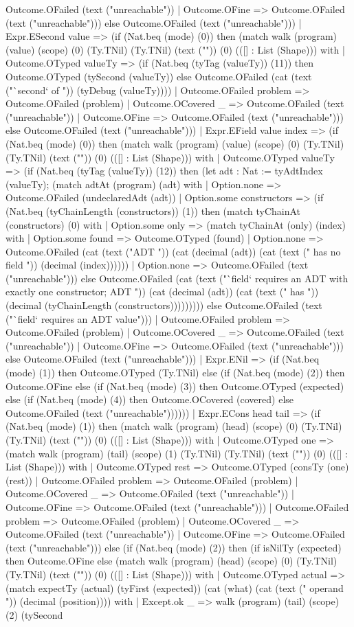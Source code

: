 \documentclass[11pt]{article}
\begin{document}
Outcome.OFailed (text ("unreachable")) | Outcome.OFine => Outcome.OFailed (text ("unreachable"))) else Outcome.OFailed (text ("unreachable"))) | Expr.ESecond value => (if (Nat.beq (mode) (0)) then (match walk (program) (value) (scope) (0) (Ty.TNil) (Ty.TNil) (text ("")) (0) (([] : List (Shape))) with | Outcome.OTyped valueTy => (if (Nat.beq (tyTag (valueTy)) (11)) then Outcome.OTyped (tySecond (valueTy)) else Outcome.OFailed (cat (text ("`second` of ")) (tyDebug (valueTy)))) | Outcome.OFailed problem => Outcome.OFailed (problem) | Outcome.OCovered \_ => Outcome.OFailed (text ("unreachable")) | Outcome.OFine => Outcome.OFailed (text ("unreachable"))) else Outcome.OFailed (text ("unreachable"))) | Expr.EField value index => (if (Nat.beq (mode) (0)) then (match walk (program) (value) (scope) (0) (Ty.TNil) (Ty.TNil) (text ("")) (0) (([] : List (Shape))) with | Outcome.OTyped valueTy => (if (Nat.beq (tyTag (valueTy)) (12)) then (let adt : Nat := tyAdtIndex (valueTy); (match adtAt (program) (adt) with | Option.none => Outcome.OFailed (undeclaredAdt (adt)) | Option.some constructors => (if (Nat.beq (tyChainLength (constructors)) (1)) then (match tyChainAt (constructors) (0) with | Option.some only => (match tyChainAt (only) (index) with | Option.some found => Outcome.OTyped (found) | Option.none => Outcome.OFailed (cat (text ("ADT ")) (cat (decimal (adt)) (cat (text (" has no field ")) (decimal (index)))))) | Option.none => Outcome.OFailed (text ("unreachable"))) else Outcome.OFailed (cat (text ("`field` requires an ADT with exactly one constructor; ADT ")) (cat (decimal (adt)) (cat (text (" has ")) (decimal (tyChainLength (constructors))))))))) else Outcome.OFailed (text ("`field` requires an ADT value"))) | Outcome.OFailed problem => Outcome.OFailed (problem) | Outcome.OCovered \_ => Outcome.OFailed (text ("unreachable")) | Outcome.OFine => Outcome.OFailed (text ("unreachable"))) else Outcome.OFailed (text ("unreachable"))) | Expr.ENil => (if (Nat.beq (mode) (1)) then Outcome.OTyped (Ty.TNil) else (if (Nat.beq (mode) (2)) then Outcome.OFine else (if (Nat.beq (mode) (3)) then Outcome.OTyped (expected) else (if (Nat.beq (mode) (4)) then Outcome.OCovered (covered) else Outcome.OFailed (text ("unreachable")))))) | Expr.ECons head tail => (if (Nat.beq (mode) (1)) then (match walk (program) (head) (scope) (0) (Ty.TNil) (Ty.TNil) (text ("")) (0) (([] : List (Shape))) with | Outcome.OTyped one => (match walk (program) (tail) (scope) (1) (Ty.TNil) (Ty.TNil) (text ("")) (0) (([] : List (Shape))) with | Outcome.OTyped rest => Outcome.OTyped (consTy (one) (rest)) | Outcome.OFailed problem => Outcome.OFailed (problem) | Outcome.OCovered \_ => Outcome.OFailed (text ("unreachable")) | Outcome.OFine => Outcome.OFailed (text ("unreachable"))) | Outcome.OFailed problem => Outcome.OFailed (problem) | Outcome.OCovered \_ => Outcome.OFailed (text ("unreachable")) | Outcome.OFine => Outcome.OFailed (text ("unreachable"))) else (if (Nat.beq (mode) (2)) then (if isNilTy (expected) then Outcome.OFine else (match walk (program) (head) (scope) (0) (Ty.TNil) (Ty.TNil) (text ("")) (0) (([] : List (Shape))) with | Outcome.OTyped actual => (match expectTy (actual) (tyFirst (expected)) (cat (what) (cat (text (" operand ")) (decimal (position)))) with | Except.ok \_ => walk (program) (tail) (scope) (2) (tySecond 
\end{document}
